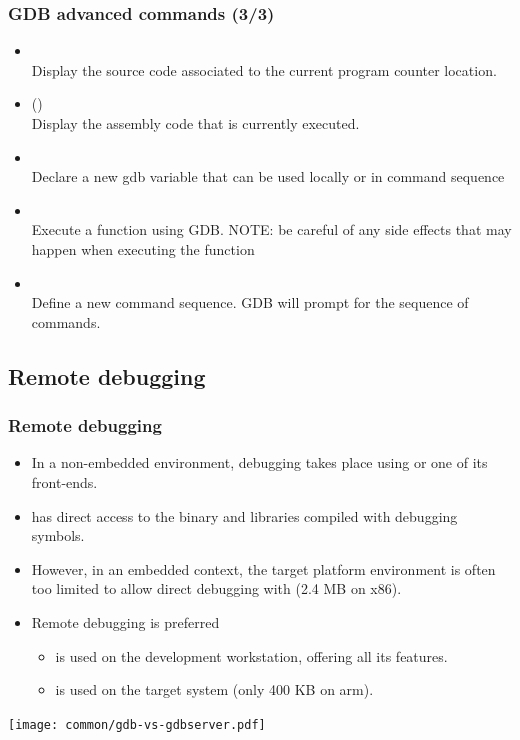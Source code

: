 {\begin{frame}
  \frametitle{GDB advanced commands (3/3)}
  \small
  \begin{itemize}
    \item {}\\
      Display the source code associated to the current program counter location.
    \item {} ()\\
      Display the assembly code that is currently executed.
    \item {}\\
      Declare a new gdb variable that can be used locally or in command sequence
    \item {}\\
      Execute a function using GDB. NOTE: be careful of any side effects that
      may happen when executing the function
    \item {}\\
      Define a new command sequence. GDB will prompt for the sequence of
      commands.
  \end{itemize}
\end{frame}
}
{
\subsection{Remote debugging}
}

\begin{frame}
  \frametitle{Remote debugging}
  \begin{itemize}
  \item In a non-embedded environment, debugging takes place using 
    or one of its front-ends.
  \item {} has direct access to the binary and libraries compiled
    with debugging symbols.
  \item However, in an embedded context, the target platform
    environment is often too limited to allow direct debugging with
     (2.4 MB on x86).
  \item Remote debugging is preferred
    \begin{itemize}
    \item {} is used on the development workstation, offering
      all its features.
    \item {} is used on the target system (only 400 KB
      on arm).
    \end{itemize}
  \end{itemize}
  \begin{center}
    \texttt{[image: common/gdb-vs-gdbserver.pdf]}
  \end{center}
\end{frame}

